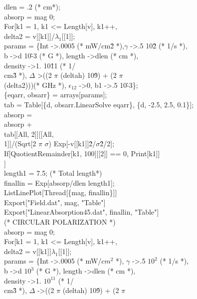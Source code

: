 \begin{enumerate}
dlen = .2 (* cm*);\\
absorp = mag 0;\\
For[k1 = 1, k1 \textless= Length[v], k1++,\\
 delta2 = v[[k1]]/$\lambda_1$[[1]];\\
 params = \{Int -\textgreater .0005 (* mW/cm\^2 *),$\gamma$ -\textgreater .5 10\^2 (* 1/s *), \\
   b -\textgreater d 10\^ -3 (* G *), length -\textgreater dlen (* cm *), \\
   density -\textgreater 1. 10\^ 11 (* 1/ \\
   cm\^ 3 *), $\Delta$ \textgreater((2 $\pi$ (deltah) 10\^9) + (2 $\pi$ \ \\
(delta2)))(* GHz *), $\epsilon_{12}$ -\textgreater 0, b1 -\textgreater  .5 10\^-3\}; \\
 \{eqarr, obsarr\} = arrays[params];\\
   tab = Table[\{d, obsarr.LinearSolve \@\@ eqarr\}, \{d, -2.5, 2.5, 0.1\}];\\
 absorp = \\
  absorp + \\
   tab[[All, 2]][[All, \\
      1]]/(Sqrt[2 $\pi$ $\sigma$) Exp[-v[[k1]]\^2/$\sigma$\^ 2/2];\\
 If[QuotientRemainder[k1, 100][[2]] == 0, Print[k1]]\\
 ]\\
length1 = 7.5; (* Total length*)\\
finallin = Exp[absorp/dlen length1];\\
ListLinePlot[Thread[\{mag, finallin\}]]\\
Export["Field.dat", mag, "Table"]\\
Export["LinearAbsorption45.dat", finallin, "Table"]\\
(*  CIRCULAR POLARIZATION *)\\
absorp = mag 0;\\
For[k1 = 1, k1 \textless = Length[v], k1++,\\
 delta2 = v[[k1]]$\lambda_1$[[1]];\\
 params = \{Int -\textgreater .0005 (* mW/$cm^2$ *), $\gamma$ -\textgreater .5 $10^2$ (* 1/s *), \\
   b -\textgreater d $10^3$ (* G *), length -\textgreater dlen (* cm *), \\
   density -\textgreater 1. $10^11$ (* 1/ \\
   cm\^3 *), $\Delta$ -\textgreater ((2 $\pi$ (deltah) 10\^9) + (2 $\pi$ \ \\

\end{enumerate}
